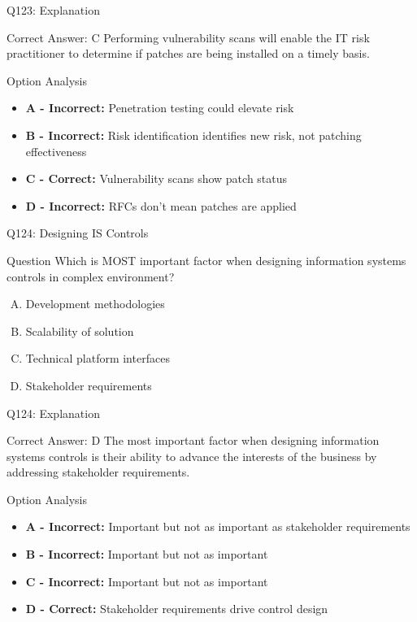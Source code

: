 \documentclass{beamer}
\begin{document}
	\begin{frame}{Q123: Explanation}
		\begin{block}{Correct Answer: C}
			Performing vulnerability scans will enable the IT risk practitioner to determine if patches are being installed on a timely basis.
		\end{block}
		\begin{block}{Option Analysis}
			\begin{itemize}
				\item \textbf{A - Incorrect:} Penetration testing could elevate risk
				\item \textbf{B - Incorrect:} Risk identification identifies new risk, not patching effectiveness
				\item \textbf{C - Correct:} Vulnerability scans show patch status
				\item \textbf{D - Incorrect:} RFCs don't mean patches are applied
			\end{itemize}
		\end{block}
	\end{frame}
	
	\begin{frame}{Q124: Designing IS Controls}
		\begin{block}{Question}
			Which is MOST important factor when designing information systems controls in complex environment?
		\end{block}
		\begin{enumerate}[(A)]
			\item Development methodologies
			\item Scalability of solution
			\item Technical platform interfaces
			\item Stakeholder requirements
		\end{enumerate}
	\end{frame}
	
	\begin{frame}{Q124: Explanation}
		\begin{block}{Correct Answer: D}
			The most important factor when designing information systems controls is their ability to advance the interests of the business by addressing stakeholder requirements.
		\end{block}
		\begin{block}{Option Analysis}
			\begin{itemize}
				\item \textbf{A - Incorrect:} Important but not as important as stakeholder requirements
				\item \textbf{B - Incorrect:} Important but not as important
				\item \textbf{C - Incorrect:} Important but not as important
				\item \textbf{D - Correct:} Stakeholder requirements drive control design
			\end{itemize}
		\end{block}
	\end{frame}
	
\end{document}
